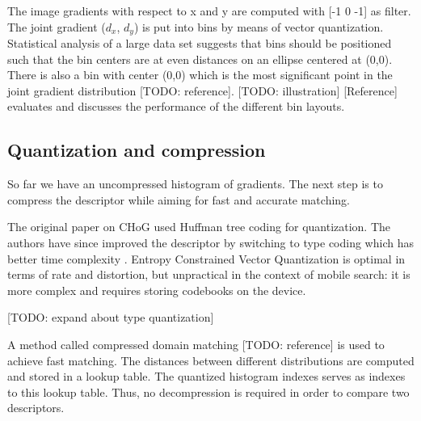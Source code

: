 The image gradients with respect to x and y are computed with [-1 0 -1] as filter. The joint gradient ($d_x$, $d_y$) is put into bins by means of vector quantization. Statistical analysis of a large data set suggests that bins should be positioned such that the bin centers are at even distances on an ellipse centered at (0,0). There is also a bin with center (0,0) which is the most significant point in the joint gradient distribution [TODO: reference]. [TODO: illustration] [Reference] evaluates and discusses the performance of the different bin layouts.

\subsection{Quantization and compression}

So far we have an uncompressed histogram of gradients. The next step is to compress the descriptor while aiming for fast and accurate matching.

The original paper on CHoG \cite{chog2009} used Huffman tree coding for quantization. The authors have since improved the descriptor by switching to type coding which has better time complexity \cite{chog2011}. Entropy Constrained Vector Quantization is optimal in terms of rate and distortion, but unpractical in the context of mobile search: it is more complex and requires storing codebooks on the device. \cite{chog2011}

[TODO: expand about type quantization]

A method called compressed domain matching [TODO: reference] is used to achieve fast matching. The distances between different distributions are computed and stored in a lookup table. The quantized histogram indexes serves as indexes to this lookup table. Thus, no decompression is required in order to compare two descriptors.
